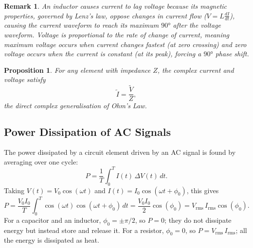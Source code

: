 \documentclass{article}
\newtheorem{remark}{Remark}
\newtheorem{proposition}{Proposition}
\begin{document}
\begin{remark}
    An inductor causes current to lag voltage because its magnetic properties, governed by Lenz's law, oppose changes in current flow ($V = L\frac{dI}{dt}$), causing the current waveform to reach its maximum $90°$ after the voltage waveform. Voltage is proportional to the rate of change of current, meaning maximum voltage occurs when current changes fastest (at zero crossing) and zero voltage occurs when the current is constant (at its peak), forcing a $90°$ phase shift.
\end{remark}
\begin{proposition}
    For any element with impedance $Z$, the complex current and voltage satisfy
    \[\tilde{I} = \frac{\tilde{V}}{Z},\]
    the direct complex generalisation of Ohm's Law.
\end{proposition}

\subsection{Power Dissipation of AC Signals}
The power dissipated by a circuit element driven by an AC signal is found by averaging over one cycle:
\[P = \frac{1}{T}\int_{0}^{T} I(t)\,\Delta V(t)\,dt.\]
Taking $V(t) = V_0\cos(\omega t)$ and $I(t) = I_0\cos(\omega t + \phi_0)$, this gives
\[P = \frac{V_0 I_0}{T}\int_{0}^{T}\cos(\omega t)\cos(\omega t + \phi_0)\,dt = \frac{V_0 I_0}{2}\cos(\phi_0) = V_{\text{rms}}\,I_{\text{rms}}\cos(\phi_0).\]
For a capacitor and an inductor, $\phi_0 = \pm\pi/2$, so $P = 0$; they do not dissipate energy but instead store and release it. For a resistor, $\phi_0 = 0$, so $P = V_{\text{rms}}\,I_{\text{rms}}$; all the energy is dissipated as heat.


\end{document}
